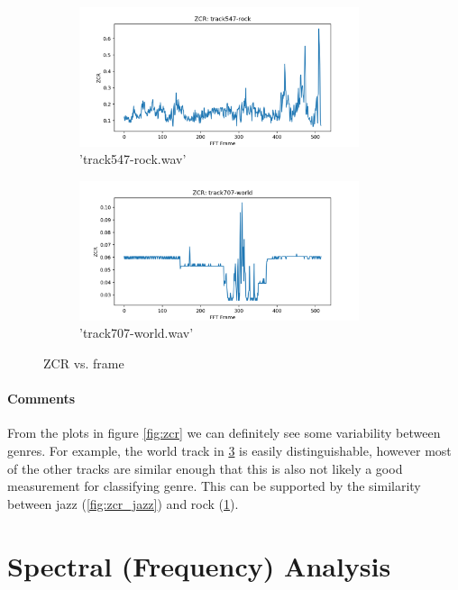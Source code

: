 \documentclass[11pt,a4paper]{article}
\begin{document}
\begin{figure}[tb]\ContinuedFloat
	\begin{subfigure}[t]{\hsize}
		\centering
		\includegraphics[width=0.9\textwidth]{zcr_track547-rock}
		\caption{'track547-rock.wav'}
		\label{fig:zcr_rock}
	\end{subfigure}
	\begin{subfigure}[t]{\hsize}
		\centering
		\includegraphics[width=0.9\textwidth]{zcr_track707-world}
		\caption{'track707-world.wav'}
		\label{fig:zcr_world}
	\end{subfigure}
	\caption{ZCR vs. frame}
\end{figure}

\paragraph{Comments} From the plots in figure \ref{fig:zcr} we can definitely see some variability between genres. For example, the world track in \ref{fig:zcr_world} is easily distinguishable, however most of the other tracks are similar enough that this is also not likely a good measurement for classifying genre. This can be supported by the similarity between jazz (\ref{fig:zcr_jazz}) and rock (\ref{fig:zcr_rock}).

\pagebreak

\section{Spectral (Frequency) Analysis}
\end{document}
